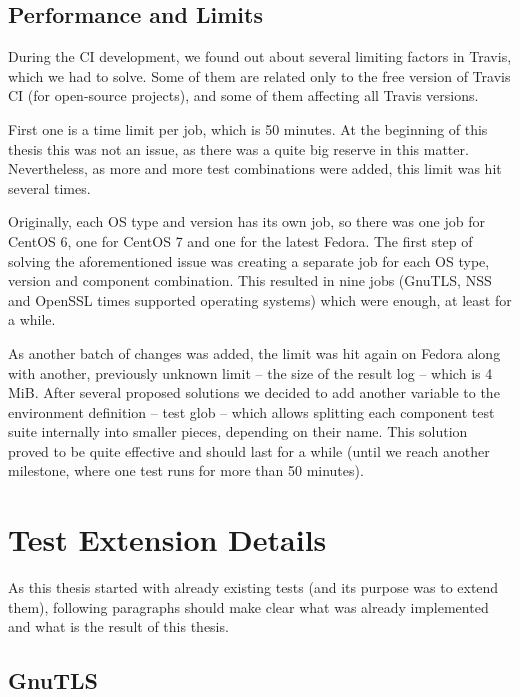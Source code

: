 \subsection{Performance and Limits} \label{ref:performance-limits}
    During the CI development, we found out about several limiting factors
    in Travis, which we had to solve. Some of them are related only to
    the free version of Travis CI (for open-source projects), and some
    of them affecting all Travis versions.

    First one is a time limit per job, which is 50 minutes. At the beginning
    of this thesis this was not an issue, as there was a quite big reserve in
    this matter. Nevertheless, as more and more test combinations were added,
    this limit was hit several times.

    Originally, each OS type and version has its own job, so there was one job
    for CentOS 6, one for CentOS 7 and one for the latest Fedora. The first
    step of solving the aforementioned issue
    was creating a separate job for each OS type, version and component
    combination. This resulted in nine jobs (GnuTLS, NSS and OpenSSL times
    supported operating systems) which were enough, at least for a while.

    As another batch of changes was added, the limit was hit again on Fedora
    along with another, previously unknown limit -- the size of the result log
    -- which is 4 MiB.
    After several proposed solutions we decided to add another variable
    to the environment definition -- test glob -- which allows splitting
    each component test suite internally into smaller pieces, depending on their
    name. This solution proved to be quite effective and should last for
    a while (until we reach another milestone, where one test runs for more than
    50 minutes).


\section{Test Extension Details}
    As this thesis started with already existing tests (and its purpose was
    to extend them), following paragraphs should make clear what was already
    implemented and what is the result of this thesis.

\subsection{GnuTLS}
